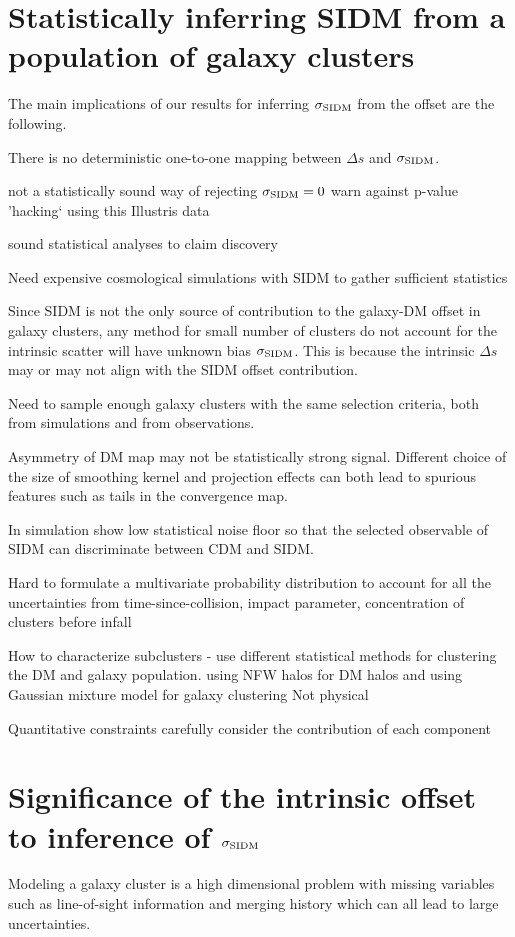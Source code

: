 \section{Statistically inferring SIDM from a population of galaxy clusters} 



The main implications of our results for inferring $\sigma_{\rm SIDM}$ from the
offset are the following.

There is no deterministic one-to-one mapping between $\Delta s$ and 
$\sigma_{\rm SIDM}$.  

not a statistically sound way of rejecting $\sigma_{\rm SIDM} = 0$
warn against p-value 'hacking` using this Illustris data

sound statistical analyses to claim discovery  

Need expensive cosmological simulations with SIDM to gather sufficient statistics 


Since SIDM is not the only source of contribution to the galaxy-DM offset 
in galaxy clusters,
any method for small number of clusters do not account for the intrinsic 
scatter will have unknown bias $\sigma_{\rm SIDM}$. 
This is because the intrinsic $\Delta s$ may or may 
not align with the SIDM offset contribution. 

Need to sample enough galaxy clusters with the same selection criteria, 
both from simulations and from observations.

Asymmetry of DM map may not be statistically strong signal.
Different choice of the size of smoothing kernel and projection effects can both 
lead to spurious features such as tails in the convergence map.

In simulation 
show low statistical noise floor so that 
the selected observable of SIDM can discriminate between CDM and SIDM.   

Hard to formulate a multivariate probability distribution to account for all
the uncertainties from 
time-since-collision, impact parameter, concentration of clusters before infall

How to characterize subclusters - 
use different statistical methods for clustering the DM and galaxy 
population. 
using NFW halos for DM halos and using
Gaussian mixture model for galaxy clustering  
Not physical

Quantitative constraints carefully consider the contribution of each component

\section{Significance of the intrinsic offset to inference of $\sigma_{\rm
SIDM}$}
Modeling a galaxy cluster is a high dimensional problem with missing
variables such as line-of-sight information and merging history which can all 
lead to large uncertainties.

